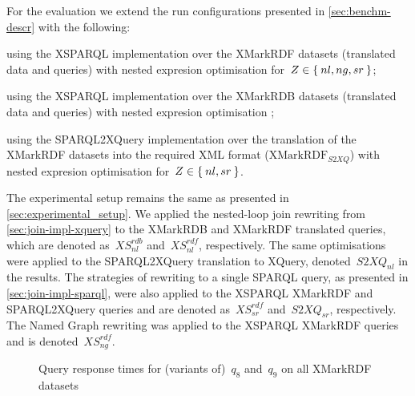 For the evaluation we extend the run configurations presented in \cref{sec:benchm-descr} with the following:
\begin{description}[noitemsep]
\item[$\mathit{XS^{rdf}_{Z}}$:] using the XSPARQL implementation over the XMarkRDF datasets (translated data and
  queries) with nested expresion optimisation  for~$Z \in \left\{\:nl,ng,sr\:\right\}$;
\item[$\mathit{XS^{rdb}_{nl}}$:] using the XSPARQL implementation over the XMarkRDB datasets (translated data and
  queries) with nested expresion optimisation ;
\item[$\mathit{S2XQ}_{Z}$:] using the SPARQL2XQuery implementation over the translation of the XMarkRDF datasets into
  the required \ac{XML} format ($\textrm{XMarkRDF}_{\mathit{S2XQ}}$) with nested expresion optimisation
   for~$Z \in \left\{\:nl,sr\:\right\}$.
\end{description}
%
The experimental setup remains the same as presented in \cref{sec:experimental_setup}.
%
We applied the nested-loop join rewriting from \cref{sec:join-impl-xquery} to the XMarkRDB and XMarkRDF translated
queries, which are denoted as~$\mathit{XS^{rdb}_{nl}}$ and~$\mathit{XS^{rdf}_{nl}}$, respectively.  The same
optimisations were applied to the SPARQL2\-XQuery translation to XQuery, denoted~$\mathit{S2XQ_{nl}}$ in the results.
%
The strategies of rewriting to a single SPARQL query, as presented in \cref{sec:join-impl-sparql}, were also applied to
the XSPARQL XMarkRDF and SPARQL2XQuery queries and are denoted as~$\mathit{XS^{rdf}_{sr}}$ and~$\mathit{S2XQ_{sr}}$,
respectively.  The Named Graph rewriting was applied to the XSPARQL XMarkRDF queries and is
denoted~$\mathit{XS^{rdf}_{ng}}$.



\def\scale{.99}
\begin{figure*}[t]\scriptsize
  \centering
  \hspace{8pt}

  \hspace{8pt}

  \hspace{8pt}
  \caption{Query response times for (variants of)~$q_8$ and~$q_9$ on all XMarkRDF datasets}
  \label{fig:evaluation-times-q8-q9} 
\end{figure*}

